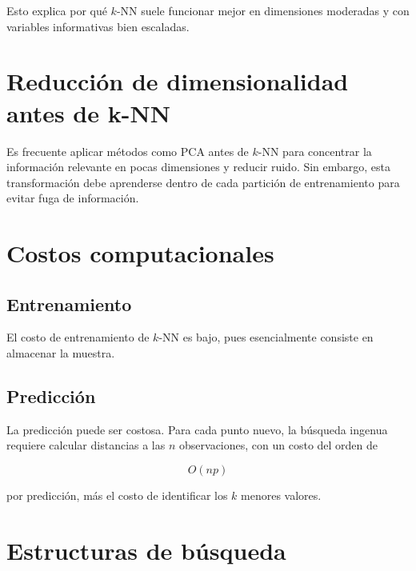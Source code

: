 \documentclass[
  spanish,
  10.5pt,
  letterpaper,
  DIV=11,
  numbers=noendperiod,
  oneside,
  open=any]{scrreprt}
\theoremstyle{definition}
\theoremstyle{definition}
\theoremstyle{plain}
\theoremstyle{remark}
\begin{document}
Esto explica por qué \(k\)-NN suele funcionar mejor en dimensiones
moderadas y con variables informativas bien escaladas.

\section*{Reducción de dimensionalidad antes de
k-NN}\label{reducciuxf3n-de-dimensionalidad-antes-de-k-nn}


Es frecuente aplicar métodos como PCA antes de \(k\)-NN para concentrar
la información relevante en pocas dimensiones y reducir ruido. Sin
embargo, esta transformación debe aprenderse dentro de cada partición de
entrenamiento para evitar fuga de información.

\section*{Costos computacionales}\label{costos-computacionales}


\subsection*{Entrenamiento}\label{entrenamiento-1}

El costo de entrenamiento de \(k\)-NN es bajo, pues esencialmente
consiste en almacenar la muestra.

\subsection*{Predicción}\label{predicciuxf3n-1}

La predicción puede ser costosa. Para cada punto nuevo, la búsqueda
ingenua requiere calcular distancias a las \(n\) observaciones, con un
costo del orden de

\[
O(np)
\]

por predicción, más el costo de identificar los \(k\) menores valores.

\section*{Estructuras de búsqueda}\label{estructuras-de-buxfasqueda}
\end{document}
